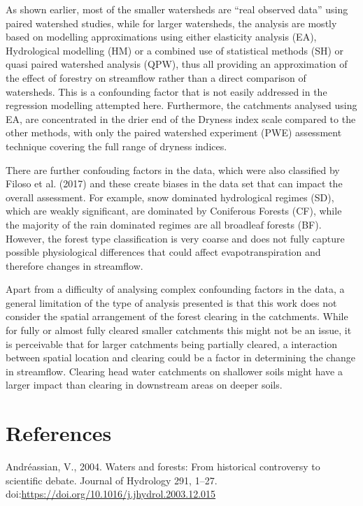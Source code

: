 \documentclass[]{elsarticle} %
\begin{document}
As shown earlier, most of the smaller watersheds are ``real observed
data'' using paired watershed studies, while for larger watersheds, the
analysis are mostly based on modelling approximations using either
elasticity analysis (EA), Hydrological modelling (HM) or a combined use
of statistical methods (SH) or quasi paired watershed analysis (QPW),
thus all providing an approximation of the effect of forestry on
streamflow rather than a direct comparison of watersheds. This is a
confounding factor that is not easily addressed in the regression
modelling attempted here. Furthermore, the catchments analysed using EA,
are concentrated in the drier end of the Dryness index scale compared to
the other methods, with only the paired watershed experiment (PWE)
assessment technique covering the full range of dryness indices.

There are further confouding factors in the data, which were also
classified by Filoso et al. (2017) and these create biases in the data
set that can impact the overall assessment. For example, snow dominated
hydrological regimes (SD), which are weakly significant, are dominated
by Coniferous Forests (CF), while the majority of the rain dominated
regimes are all broadleaf forests (BF). However, the forest type
classification is very coarse and does not fully capture possible
physiological differences that could affect evapotranspiration and
therefore changes in streamflow.

Apart from a difficulty of analysing complex confounding factors in the
data, a general limitation of the type of analysis presented is that
this work does not consider the spatial arrangement of the forest
clearing in the catchments. While for fully or almost fully cleared
smaller catchments this might not be an issue, it is perceivable that
for larger catchments being partially cleared, a interaction between
spatial location and clearing could be a factor in determining the
change in streamflow. Clearing head water catchments on shallower soils
might have a larger impact than clearing in downstream areas on deeper
soils.

\hypertarget{references}{%
\section*{References}\label{references}}

\hypertarget{refs}{}
\leavevmode\hypertarget{ref-andreassian2004}{}%
Andréassian, V., 2004. Waters and forests: From historical controversy
to scientific debate. Journal of Hydrology 291, 1--27.
doi:\href{https://doi.org/https://doi.org/10.1016/j.jhydrol.2003.12.015}{https://doi.org/10.1016/j.jhydrol.2003.12.015}
\end{document}
